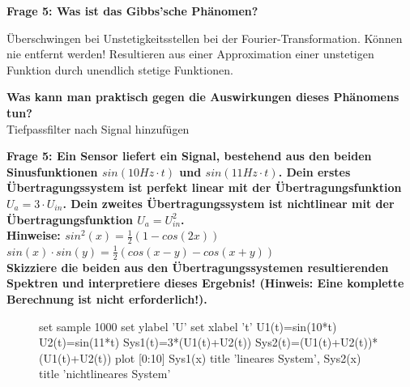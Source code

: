 \documentclass[11pt,a4paper]{scrartcl}
\begin{document}
\textbf{Frage 5: Was ist das Gibbs'sche Phänomen?}
\begin{center}
\end{center}
Überschwingen bei Unstetigkeitsstellen bei der Fourier-Transformation. Können nie entfernt werden! Resultieren aus einer Approximation einer unstetigen Funktion durch unendlich stetige Funktionen.

\textbf{Was kann man praktisch gegen die Auswirkungen dieses Phänomens tun?}\\
Tiefpassfilter nach Signal hinzufügen
\newpage

\textbf{Frage 5: Ein Sensor liefert ein Signal, bestehend aus den beiden Sinusfunktionen $sin(10Hz \cdot t)$ und $sin(11Hz \cdot t)$. Dein erstes Übertragungssystem ist perfekt linear mit der Übertragungsfunktion
$U_{a} = 3 \cdot U_{in}$. Dein zweites Übertragungssystem ist nichtlinear mit der Übertragungsfunktion $U_a =  U_{in}^2$. \\
Hinweise: $sin^2(x)=\frac{1}{2}(1-cos(2x))$\\$sin(x)\cdot sin(y) = \frac{1}{2}(cos(x-y)-cos(x+y))$\\ 
Skizziere die beiden aus den Übertragungssystemen resultierenden Spektren und interpretiere dieses Ergebnis! (Hinweis: Eine komplette Berechnung ist nicht erforderlich!).}\\
\begin{figure}[H]
	\centering
	\begin{gnuplot}[terminal=pdf]
			set sample 1000
			set ylabel 'U'
			set xlabel 't'
			U1(t)=sin(10*t)
			U2(t)=sin(11*t)
			Sys1(t)=3*(U1(t)+U2(t))
			Sys2(t)=(U1(t)+U2(t))*(U1(t)+U2(t))
			plot [0:10] Sys1(x) title 'lineares System', Sys2(x) title 'nichtlineares System'
	\end{gnuplot}
\end{figure}
\end{document}
